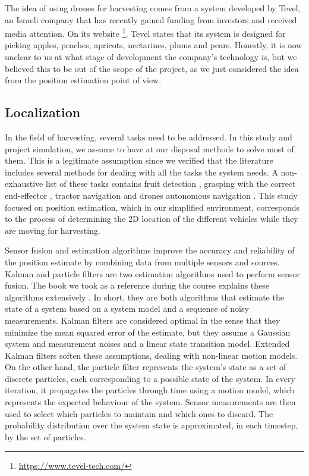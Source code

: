 \documentclass[letterpaper,twocolumn,10pt]{article}
\begin{document}
The idea of using drones for harvesting comes from a system developed by Tevel, an Israeli company that has recently gained funding from investors and received media attention. On its website \footnote{\url{https://www.tevel-tech.com/}}, Tevel states that its system is designed for picking apples, peaches, apricots, nectarines, plums and pears. Honestly, it is now unclear to us at what stage of development the company's technology is, but we believed this to be out of the scope of the project, as we just considered the idea from the position estimation point of view.

\subsection*{Localization}
In the field of harvesting, several tasks need to be addressed. In this study and project simulation, we assume to have at our disposal methods to solve most of them. This is a legitimate assumption since we verified that the literature includes several methods for dealing with all the tasks the system needs. A non-exhaustive list of these tasks contains fruit detection \cite{BARTH2018284}, grasping with the correct end-effector \cite{agriculture12081240}, tractor navigation \cite{Stentz2002} and drones autonomous navigation \cite{DronesNavigation}. This study focused on position estimation, which in our simplified environment, corresponds to the process of determining the 2D location of the different vehicles while they are moving for harvesting. 

Sensor fusion and estimation algorithms improve the accuracy and reliability of the position estimate by combining data from multiple sensors and sources. Kalman and particle filters are two estimation algorithms used to perform sensor fusion. The book we took as a reference during the course explains these algorithms extensively \cite{thrun2005probabilistic}. In short, they are both algorithms that estimate the state of a system based on a system model and a sequence of noisy measurements. 
Kalman filters are considered optimal in the sense that they minimize the mean squared error of the estimate, but they assume a Gaussian system and measurement noises and a linear state transition model. Extended Kalman filters soften these assumptions, dealing with non-linear motion models. On the other hand, the particle filter represents the system's state as a set of discrete particles, each corresponding to a possible state of the system. In every iteration, it propagates the particles through time using a motion model, which represents the expected behaviour of the system. Sensor measurements are then used to select which particles to maintain and which ones to discard. The probability distribution over the system state is approximated, in each timestep, by the set of particles.
\end{document}
